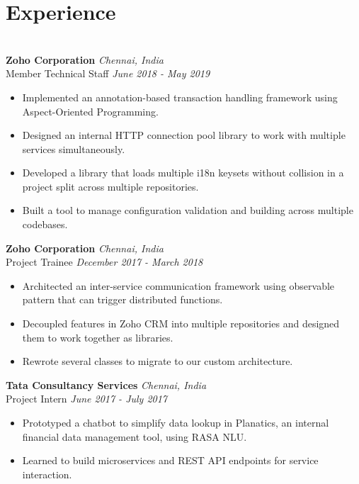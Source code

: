 \documentclass{resume}
\begin{document}
\section*{Experience}
\titlerule
\noindent
\\
\textbf{Zoho Corporation} \hfill \textit{Chennai, India} \\
{\small Member Technical Staff} \hfill \textit{\small June 2018 - May 2019}
\begin{itemize}
      \item Implemented an annotation-based transaction handling framework using Aspect-Oriented Programming.
  \item Designed an internal HTTP connection pool library to work with multiple services simultaneously.
  \item Developed a library that loads multiple i18n keysets without collision in a project split across multiple repositories.
  \item Built a tool to manage configuration validation and building across multiple codebases.
\end{itemize}
\textbf{Zoho Corporation} \hfill \textit{Chennai, India} \\
{\small Project Trainee} \hfill \textit{\small December 2017 - March 2018}
\begin{itemize}
  \item Architected an inter-service communication framework using observable pattern that can trigger distributed functions.
  \item Decoupled features in Zoho CRM into multiple repositories and designed them to work together as libraries.
  \item Rewrote several classes to migrate to our custom architecture.
\end{itemize}
\textbf{Tata Consultancy Services} \hfill \textit{Chennai, India} \\
{\small Project Intern} \hfill \textit{\small June 2017 - July 2017}
\begin{itemize}
  \item Prototyped a chatbot to simplify data lookup in Planatics, an internal financial data management tool, using RASA NLU.
  \item Learned to build microservices and REST API endpoints for service interaction.
\end{itemize}
\end{document}
